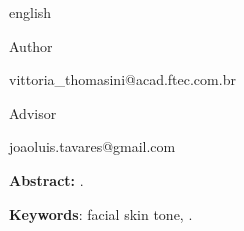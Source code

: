 \begin{Spacing}{1.0}
    \begin{otherlanguage*}{english}

\begin{center}
    \ABNTEXchapterfont\bfseries\large\imprimirtitulo
\end{center}
\hfill

\hspace*{0pt}\hfill \bfseries\normalsize \imprimirautor

\hspace*{0pt}\hfill \normalfont Author

\hspace*{0pt}\hfill \normalfont vittoria\_thomasini@acad.ftec.com.br

\hfill

\hspace*{0pt}\hfill 
{\bfseries\normalsize \imprimirorientador \par} 

\hspace*{0pt}\hfill \normalfont\normalsize Advisor

\hspace*{0pt}\hfill \normalfont joaoluis.tavares@gmail.com

\hfill

\hfill

\begin{resumo}[]
    
\textbf{Abstract:} .
\hfill

\textbf{Keywords}: facial skin tone, . 
\end{resumo}
    \end{otherlanguage*}
\end{Spacing}\PRIVATEclearpageifneeded